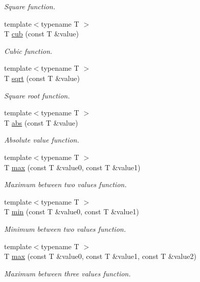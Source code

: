 \begin{DoxyCompactItemize}
\begin{DoxyCompactList}\small\item\em Square function. \end{DoxyCompactList}\item 
{\footnotesize template$<$typename T $>$ }\\T \hyperlink{namespaceddd_abbdb4782fa0a78950fd49de0d5766dd2}{cub} (const T \&value)
\begin{DoxyCompactList}\small\item\em Cubic function. \end{DoxyCompactList}\item 
{\footnotesize template$<$typename T $>$ }\\T \hyperlink{namespaceddd_a99ebeda8499ba29e0302f0f3c6e43549}{sqrt} (const T \&value)
\begin{DoxyCompactList}\small\item\em Square root function. \end{DoxyCompactList}\item 
{\footnotesize template$<$typename T $>$ }\\T \hyperlink{namespaceddd_a9ac20d4240d0a9fa208e3dd220101a0a}{abs} (const T \&value)
\begin{DoxyCompactList}\small\item\em Absolute value function. \end{DoxyCompactList}\item 
{\footnotesize template$<$typename T $>$ }\\T \hyperlink{namespaceddd_ac22862b5ed1b5bf5ba4d52e4a740bef9}{max} (const T \&value0, const T \&value1)
\begin{DoxyCompactList}\small\item\em Maximum between two values function. \end{DoxyCompactList}\item 
{\footnotesize template$<$typename T $>$ }\\T \hyperlink{namespaceddd_aa11a0222d3d3c7580e0b8b40b38258df}{min} (const T \&value0, const T \&value1)
\begin{DoxyCompactList}\small\item\em Minimum between two values function. \end{DoxyCompactList}\item 
{\footnotesize template$<$typename T $>$ }\\T \hyperlink{namespaceddd_a64cb844784cf8f7a2a9d691f7c6bcba3}{max} (const T \&value0, const T \&value1, const T \&value2)
\begin{DoxyCompactList}\small\item\em Maximum between three values function. \end{DoxyCompactList}\item 

\end{DoxyCompactItemize}
